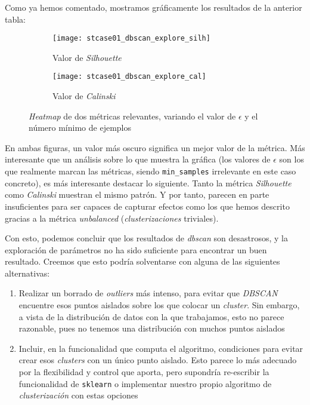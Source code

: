 \documentclass[11pt]{article}
\begin{document}
Como ya hemos comentado, mostramos gráficamente los resultados de la anterior tabla:

\begin{figure}[H]
    \centering

    \begin{subfigure}[b]{0.45 \textwidth}
        \texttt{[image: stcase01\_dbscan\_explore\_silh]}
        \caption{Valor de \emph{Silhouette}}
    \end{subfigure}
    \begin{subfigure}[b]{0.45 \textwidth}
        \texttt{[image: stcase01\_dbscan\_explore\_cal]}
        \caption{Valor de \emph{Calinski}}
    \end{subfigure}

    \caption{\emph{Heatmap} de dos métricas relevantes, variando el valor de $\epsilon$ y el número mínimo de ejemplos}
\end{figure}

En ambas figuras, un valor más oscuro significa un mejor valor de la métrica. Más interesante que un análisis sobre lo que muestra la gráfica (los valores de $\epsilon$ son los que realmente marcan las métricas, siendo \lstinline{min_samples} irrelevante en este caso concreto), es más interesante destacar lo siguiente. Tanto la métrica \emph{Silhouette} como \emph{Calinski} muestran el mismo patrón. Y por tanto, parecen en parte insuficientes para ser capaces de capturar efectos como los que hemos descrito gracias a la métrica \emph{unbalanced} (\emph{clusterizaciones} triviales).

Con esto, podemos concluir que los resultados de \emph{dbscan} son desastrosos, y la exploración de parámetros no ha sido suficiente para encontrar un buen resultado. Creemos que esto podría solventarse con alguna de las siguientes alternativas:

\begin{enumerate}
    \item Realizar un borrado de \emph{outliers} más intenso, para evitar que \emph{DBSCAN} encuentre esos puntos aislados sobre los que colocar un \emph{cluster}. Sin embargo, a vista de la distribución de datos con la que trabajamos, esto no parece razonable, pues no tenemos una distribución con muchos puntos aislados
    \item Incluir, en la funcionalidad que computa el algoritmo, condiciones para evitar crear esos \emph{clusters} con un único punto aislado. Esto parece lo más adecuado por la flexibilidad y control que aporta, pero supondría re-escribir la funcionalidad de \lstinline{sklearn} o implementar nuestro propio algoritmo de \emph{clusterización} con estas opciones
\end{enumerate}
\end{document}
